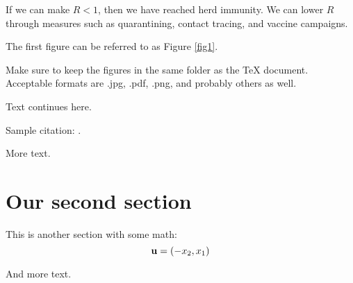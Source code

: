 \documentclass{amsart}
\theoremstyle{definition}
\numberwithin{equation}{section}
\def\ve#1{{\bf #1}}
\begin{document}
\begin{sansmath}
If we can make $R < 1$, then we have reached herd immunity. We can lower $R$ through measures such as quarantining, contact tracing, and vaccine campaigns.

\newpage

%





The first figure can be referred to as  Figure \ref{fig1}.

Make sure to keep the figures in the same folder as the TeX document.
Acceptable formats are .jpg, .pdf, .png, and probably others as well.

Text continues here.

Sample citation:  \cite{alexandrov}.

More text.

\section{Our second section}

This is another section
with some math:
    $$ \ve u = (-x_2, x_1) $$


And more text.
    \medskip




\end{sansmath}
\end{document}
